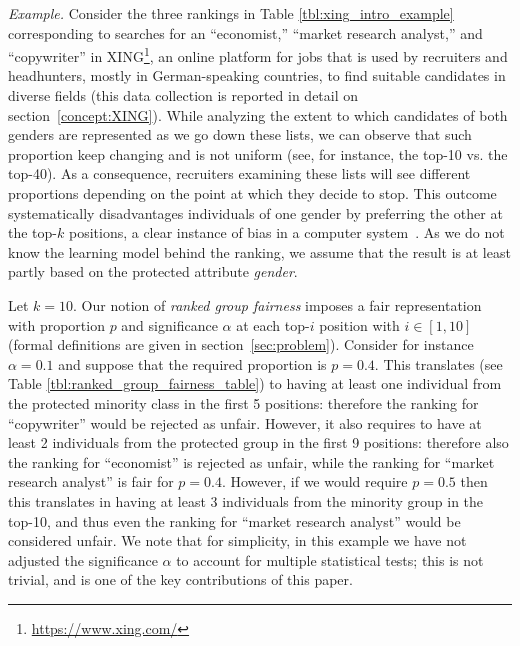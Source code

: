 \medskip
\textit{Example.} Consider the three rankings in Table \ref{tbl:xing_intro_example} corresponding to searches for an ``economist,'' ``market research analyst,'' and ``copywriter'' in XING\footnote{\url{https://www.xing.com/}}, an online platform for jobs that is used by recruiters and headhunters, mostly in German-speaking countries, to find suitable candidates in diverse fields (this data collection is reported in detail on section~\ref{concept:XING}). While analyzing  the extent to which candidates of both genders are represented as we go down these lists,  we can observe that such proportion keep changing and is not uniform (see, for instance, the top-10 vs. the top-40). As a consequence, recruiters examining these lists will see different proportions depending on the point at which they decide to stop.
%
This outcome systematically disadvantages individuals of one gender by preferring the other at the top-$k$ positions, a clear instance of bias in a computer system~\cite{friedman1996bias}. As we do not know the learning model behind the ranking, we assume that the result is at least partly based on the protected attribute \emph{gender}.

Let $k = 10$. Our notion of \textit{ranked group fairness} imposes a fair representation with proportion $p$ and significance $\alpha$ at each top-$i$ position with $i \in [1,10]$ (formal definitions are given in section~\ref{sec:problem}).
Consider for instance $\alpha = 0.1$ and suppose that the required proportion is $p = 0.4$.  This translates (see Table \ref{tbl:ranked_group_fairness_table}) to having at least one individual from the protected minority class in the first 5 positions: therefore the ranking for  ``copywriter'' would be rejected as unfair. However, it also requires to have at least 2 individuals from the protected group in the first 9 positions: therefore also the ranking for ``economist'' is rejected as unfair, while the ranking for ``market research analyst'' is fair for  $p = 0.4$. However, if we would require $p = 0.5$ then this translates in having at least 3 individuals from the minority group in the top-10, and thus even the ranking for ``market research analyst'' would be considered unfair.
%
We note that for simplicity, in this example we have not adjusted the significance $\alpha$ to account for multiple statistical tests; this is not trivial, and is one of the key contributions of this paper.
\medskip


